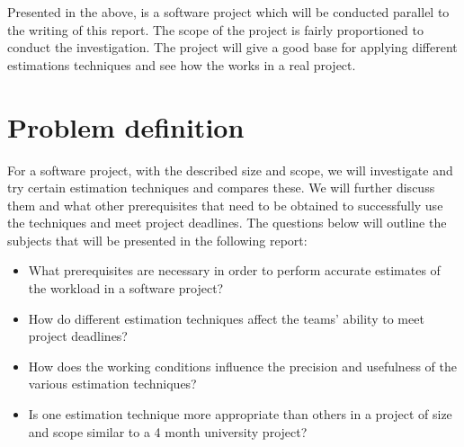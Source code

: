 Presented in the above, is a software project which will be conducted parallel to the writing of this report. The scope of the project is fairly proportioned to conduct the investigation. The project will give a good base for applying different estimations techniques and see how the works in a real project. 


\section{Problem definition}
For a software project, with the described size and scope, we will investigate and try certain estimation techniques and compares these. We will further discuss them and what other prerequisites that need to be obtained to successfully use the techniques and meet project deadlines. The questions below will outline the subjects that will be presented in the following report:  
\begin{itemize}
\item What prerequisites are necessary in order to perform accurate estimates of the workload in a software project?
\item How do different estimation techniques affect the teams' ability to meet project deadlines?
\item How does the working conditions influence the precision and usefulness of the various estimation techniques?	
\item Is one estimation technique more appropriate than others in a project of size and scope similar to a 4 month university project?
\newpage

\end{itemize}
